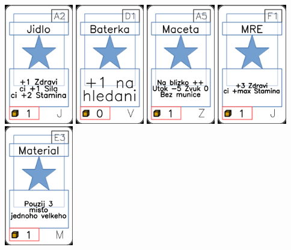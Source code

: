 \documentclass[a4paper]{article}
\begin{document}
	\includegraphics[width=3.0cm]{img-1_1}
	\includegraphics[width=3.0cm]{img-1_75}
	\includegraphics[width=3.0cm]{img-1_94}
	\includegraphics[width=3.0cm]{img-1_25}
	\includegraphics[width=3.0cm]{img-1_52}
\end{document}
